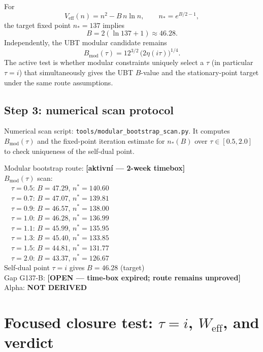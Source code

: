 \documentclass[12pt,a4paper]{article}
\begin{document}
For
\[
V_{\mathrm{eff}}(n)=n^2-B\,n\ln n,\qquad
n_*=e^{B/2-1},
\]
the target fixed point $n_*=137$ implies
\[
B=2(\ln 137+1)\approx 46.28.
\]
Independently, the UBT modular candidate remains
\[
B_{\mathrm{mod}}(\tau)=12^{3/2}\,\bigl(2\eta(i\tau)\bigr)^{1/4}.
\]
The active test is whether modular constraints uniquely select a $\tau$ (in
particular $\tau=i$) that simultaneously gives the UBT $B$-value and the
stationary-point target under the same route assumptions.

\subsection*{Step 3: numerical scan protocol}

Numerical scan script: \texttt{tools/modular\_bootstrap\_scan.py}.  It computes
$B_{\mathrm{mod}}(\tau)$ and the fixed-point iteration estimate for $n_*(B)$ over
$\tau\in[0.5,2.0]$ to check uniqueness of the self-dual point.

\begin{statusbox}
Modular bootstrap route: \textbf{[aktivní — 2-week timebox]}\\
$B_{\mathrm{mod}}(\tau)$ scan: \\
\ \ $\tau=0.5$: $B=47.29$, $n^*=140.60$\\
\ \ $\tau=0.7$: $B=47.07$, $n^*=139.81$\\
\ \ $\tau=0.9$: $B=46.57$, $n^*=138.00$\\
\ \ $\tau=1.0$: $B=46.28$, $n^*=136.99$\\
\ \ $\tau=1.1$: $B=45.99$, $n^*=135.95$\\
\ \ $\tau=1.3$: $B=45.40$, $n^*=133.85$\\
\ \ $\tau=1.5$: $B=44.81$, $n^*=131.77$\\
\ \ $\tau=2.0$: $B=43.37$, $n^*=126.67$\\
Self-dual point $\tau=i$ gives $B=46.28$ (target)\\
Gap G137-B: \textbf{[OPEN — time-box expired; route remains unproved]}\\
Alpha: \textbf{NOT DERIVED}
\end{statusbox}

\section{Focused closure test: \(\tau=i\), \(W_{\mathrm{eff}}\), and verdict}
\label{sec:taui_focus}
\end{document}
